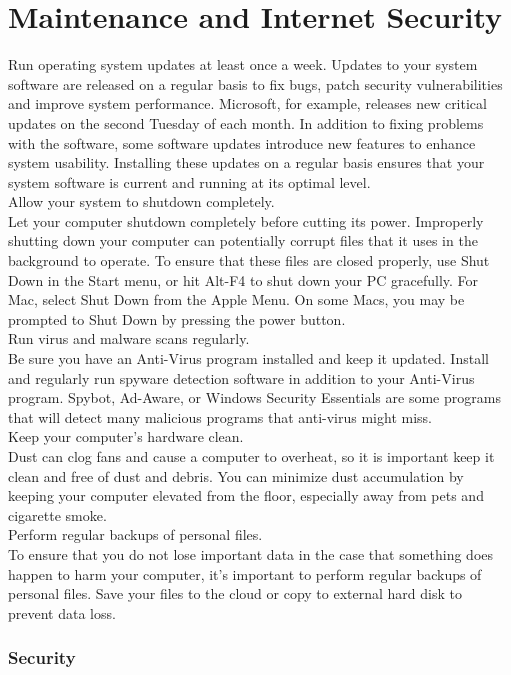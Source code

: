 \documentclass[11pt,a4paper,twoside]{article}
\begin{document}
\part{Maintenance and Internet Security}
Run operating system updates at least once a week.
Updates to your system software are released on a regular basis to fix bugs, patch security vulnerabilities and improve system performance. Microsoft, for example, releases new critical updates on the second Tuesday of each month. In addition to fixing problems with the software, some software updates introduce new features to enhance system usability. Installing these updates on a regular basis ensures that your system software is current and running at its optimal level.\\
Allow your system to shutdown completely.\\
Let your computer shutdown completely before cutting its power. Improperly shutting down your computer can potentially corrupt files that it uses in the background to operate. To ensure that these files are closed properly, use Shut Down in the Start menu, or hit Alt-F4 to shut down your PC gracefully. For Mac, select Shut Down from the Apple Menu. On some Macs, you may be prompted to Shut Down by pressing the power button.\\
Run virus and malware scans regularly.\\
Be sure you have an Anti-Virus program installed and keep it updated. Install and regularly run spyware detection software in addition to your Anti-Virus program. Spybot, Ad-Aware, or Windows Security Essentials are some programs that will detect many malicious programs that anti-virus might miss.\\
Keep your computer’s hardware clean.\\
Dust can clog fans and cause a computer to overheat, so it is important keep it clean and free of dust and debris. You can minimize dust accumulation by keeping your computer elevated from the floor, especially away from pets and cigarette smoke.\\
Perform regular backups of personal files.\\
To ensure that you do not lose important data in the case that something does happen to harm your computer, it’s important to perform regular backups of personal files. Save your files to the cloud or copy to external hard disk to prevent data loss.
\section{Security}
\end{document}
